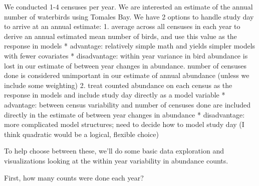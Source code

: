 \documentclass[
]{article}
\newenvironment{Shaded}{\begin{snugshade}}{\end{snugshade}}
\newcommand{\CommentTok}[1]{\textcolor[rgb]{0.56,0.35,0.01}{\textit{#1}}}
\newcommand{\DataTypeTok}[1]{\textcolor[rgb]{0.13,0.29,0.53}{#1}}
\newcommand{\DecValTok}[1]{\textcolor[rgb]{0.00,0.00,0.81}{#1}}
\newcommand{\KeywordTok}[1]{\textcolor[rgb]{0.13,0.29,0.53}{\textbf{#1}}}
\newcommand{\NormalTok}[1]{#1}
\newcommand{\OperatorTok}[1]{\textcolor[rgb]{0.81,0.36,0.00}{\textbf{#1}}}
\newcommand{\StringTok}[1]{\textcolor[rgb]{0.31,0.60,0.02}{#1}}
\begin{document}
\begin{Shaded}
\end{Shaded}

We conducted 1-4 censuses per year. We are interested an estimate of the
annual number of waterbirds using Tomales Bay. We have 2 options to
handle study day to arrive at an annual estimate: 1. average across all
censuses in each year to derive an annual estimated mean number of
birds, and use this value as the response in models * advantage:
relatively simple math and yields simpler models with fewer covariates *
disadvantage: within year variance in bird abundance is lost in our
estimate of between year changes in abundance. number of censuses done
is considered unimportant in our estimate of annual abundance (unless we
include some weighting) 2. treat counted abundance on each census as the
response in models and include study day directly as a model variable *
advantage: between census variability and number of censuses done are
included directly in the estimate of between year changes in abundance *
disadvantage: more complicated model structures; need to decide how to
model study day (I think quadratic would be a logical, flexible choice)

To help choose between these, we'll do some basic data exploration and
visualizations looking at the within year variability in abundance
counts.

First, how many counts were done each year?

\begin{Shaded}
\end{Shaded}
\end{document}

